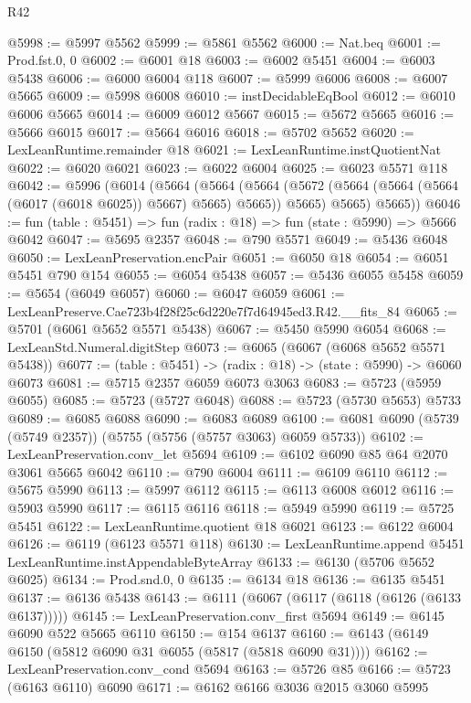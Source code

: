 \begin{lexlean}{R42}
\begin{coremodule}
@5998 := @5997 @5562
@5999 := @5861 @5562
@6000 := Nat.beq
@6001 := Prod.fst.{0, 0}
@6002 := @6001 @18
@6003 := @6002 @5451
@6004 := @6003 @5438
@6006 := @6000 @6004 @118
@6007 := @5999 @6006
@6008 := @6007 @5665
@6009 := @5998 @6008
@6010 := instDecidableEqBool
@6012 := @6010 @6006 @5665
@6014 := @6009 @6012 @5667
@6015 := @5672 @5665
@6016 := @5666 @6015
@6017 := @5664 @6016
@6018 := @5702 @5652
@6020 := LexLeanRuntime.remainder @18
@6021 := LexLeanRuntime.instQuotientNat
@6022 := @6020 @6021
@6023 := @6022 @6004
@6025 := @6023 @5571 @118
@6042 := @5996
    (@6014
      (@5664
        (@5664
          (@5664 (@5672 (@5664 (@5664 (@5664 (@6017 (@6018 @6025)) @5667) @5665) @5665)) @5665)
          @5665)
        @5665))
@6046 := fun (table : @5451) => fun (radix : @18) => fun (state : @5990) => @5666 @6042
@6047 := @5695 @2357
@6048 := @790 @5571
@6049 := @5436 @6048
@6050 := LexLeanPreservation.encPair
@6051 := @6050 @18
@6054 := @6051 @5451 @790 @154
@6055 := @6054 @5438
@6057 := @5436 @6055 @5458
@6059 := @5654 (@6049 @6057)
@6060 := @6047 @6059
@6061 := LexLeanPreserve.Cae723b4f28f25c6d220e7f7d64945ed3.R42.__fits_84
@6065 := @5701 (@6061 @5652 @5571 @5438)
@6067 := @5450 @5990 @6054
@6068 := LexLeanStd.Numeral.digitStep
@6073 := @6065 (@6067 (@6068 @5652 @5571 @5438))
@6077 := (table : @5451) -> (radix : @18) -> (state : @5990) -> @6060 @6073
@6081 := @5715 @2357 @6059 @6073 @3063
@6083 := @5723 (@5959 @6055)
@6085 := @5723 (@5727 @6048)
@6088 := @5723 (@5730 @5653) @5733
@6089 := @6085 @6088
@6090 := @6083 @6089
@6100 := @6081 @6090 (@5739 (@5749 @2357)) (@5755 (@5756 (@5757 @3063) @6059 @5733))
@6102 := LexLeanPreservation.conv_let @5694
@6109 := @6102 @6090 @85 @64 @2070 @3061 @5665 @6042
@6110 := @790 @6004
@6111 := @6109 @6110
@6112 := @5675 @5990
@6113 := @5997 @6112
@6115 := @6113 @6008 @6012
@6116 := @5903 @5990
@6117 := @6115 @6116
@6118 := @5949 @5990
@6119 := @5725 @5451
@6122 := LexLeanRuntime.quotient @18 @6021
@6123 := @6122 @6004
@6126 := @6119 (@6123 @5571 @118)
@6130 := LexLeanRuntime.append @5451 LexLeanRuntime.instAppendableByteArray
@6133 := @6130 (@5706 @5652 @6025)
@6134 := Prod.snd.{0, 0}
@6135 := @6134 @18
@6136 := @6135 @5451
@6137 := @6136 @5438
@6143 := @6111 (@6067 (@6117 (@6118 (@6126 (@6133 @6137)))))
@6145 := LexLeanPreservation.conv_first @5694
@6149 := @6145 @6090 @522 @5665 @6110
@6150 := @154 @6137
@6160 := @6143 (@6149 @6150 (@5812 @6090 @31 @6055 (@5817 (@5818 @6090 @31))))
@6162 := LexLeanPreservation.conv_cond @5694
@6163 := @5726 @85
@6166 := @5723 (@6163 @6110) @6090
@6171 := @6162 @6166 @3036 @2015 @3060 @5995

\end{coremodule}
\end{lexlean}
